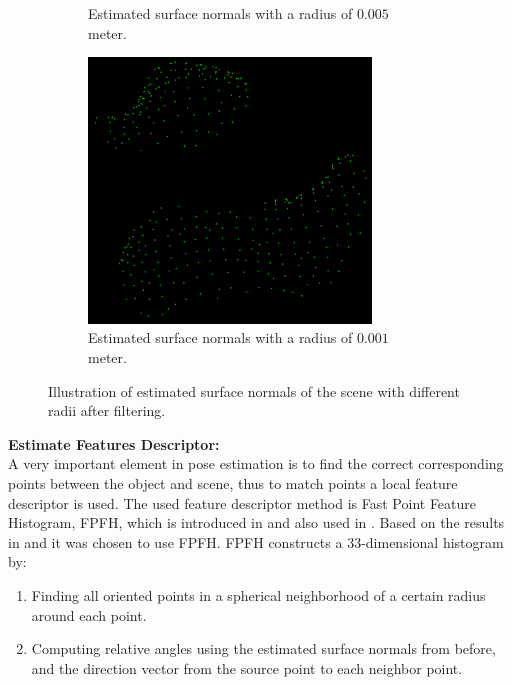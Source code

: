 \documentclass[../main.tex]{subfiles}
\begin{document}
\begin{figure}[H]
\begin{subfigure}[t]{0.17\textwidth}
        \caption{Estimated surface normals with a radius of $0.005$ meter.}
        \label{subfig:sds_normals_0.005}
    \end{subfigure}
    \begin{subfigure}[t]{0.19\textwidth}
        \centering
        \captionsetup{width=0.825\textwidth}
        \includegraphics[width=0.825\textwidth]{figures/simulated_depth_sensor/global/normals_001.png}
        \caption{Estimated surface normals with a radius of $0.001$ meter.}
        \label{subfig:sds_normals_0.001}
    \end{subfigure}
    \caption{Illustration of estimated surface normals of the scene with different radii after filtering.}
    \label{fig:sds_normals}
\end{figure}
\textbf{Estimate Features Descriptor:}\\
A very important element in pose estimation is to find the correct corresponding points between the object and scene, thus to match points a local feature descriptor is used. The used feature descriptor method is Fast Point Feature Histogram, FPFH, which is introduced in \cite{fpfh} and also used in \cite{buch2013pose}. Based on the results in \cite{fpfh} and \cite{buch2013pose} it was chosen to use FPFH. FPFH constructs a 33-dimensional histogram by:
\begin{enumerate}
    \item Finding all oriented points in a spherical neighborhood of a certain radius around each point.
    \item Computing relative angles using the estimated surface normals from before, and the direction vector from the source point to each neighbor point.
\end{enumerate}
\end{document}
